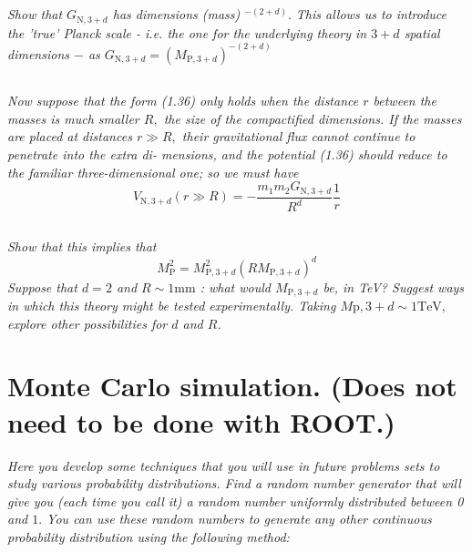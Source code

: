 \documentclass{article}
\begin{document}
\subsection{}
\textit{Show that $G_{\mathrm{N}, 3+d}$ has dimensions (mass) $^{-(2+d)} .$ This allows us to introduce the 'true' Planck scale - i.e. the one for the underlying theory in $3+d$ spatial dimensions $-$ as $G_{\mathrm{N}, 3+d}=\left(M_{\mathrm{P}, 3+d}\right)^{-(2+d)}$}

\subsection{}
\textit{Now suppose that the form (1.36) only holds when the distance $r$ between the masses is much smaller $R,$ the size of the compactified dimensions. If the masses are placed at distances $r \gg R,$ their gravitational flux cannot continue to penetrate into the extra di- mensions, and the potential (1.36) should reduce to the familiar three-dimensional one; so we must have
$$
V_{\mathrm{N}, 3+d}(r \gg R)=-\frac{m_{1} m_{2} G_{\mathrm{N}, 3+d}}{R^{d}} \frac{1}{r}
$$}

\subsection{}
\textit{Show that this implies that
$$
M_{\mathrm{P}}^{2}=M_{\mathrm{P}, 3+d}^{2}\left(R M_{\mathrm{P}, 3+d}\right)^{d}
$$
Suppose that $d=2$ and $R \sim 1 \mathrm{mm}$ : what would $M_{\mathrm{P}, 3+d}$ be, in TeV? Suggest ways in which this theory might be tested experimentally. Taking $M \mathrm{p}, 3+d \sim 1 \mathrm{TeV},$ explore other possibilities for $d$ and $R$.}


\newpage


\section{Monte Carlo simulation. (Does not need to be done with ROOT.)}
\textit{ Here you develop some techniques that you will use in future problems sets to study various probability distributions. Find a random number generator that will give you (each time you call it) a random number uniformly distributed between 0 and $1 .$ You can use these random numbers to generate any other continuous probability distribution using the following method:}
\end{document}
